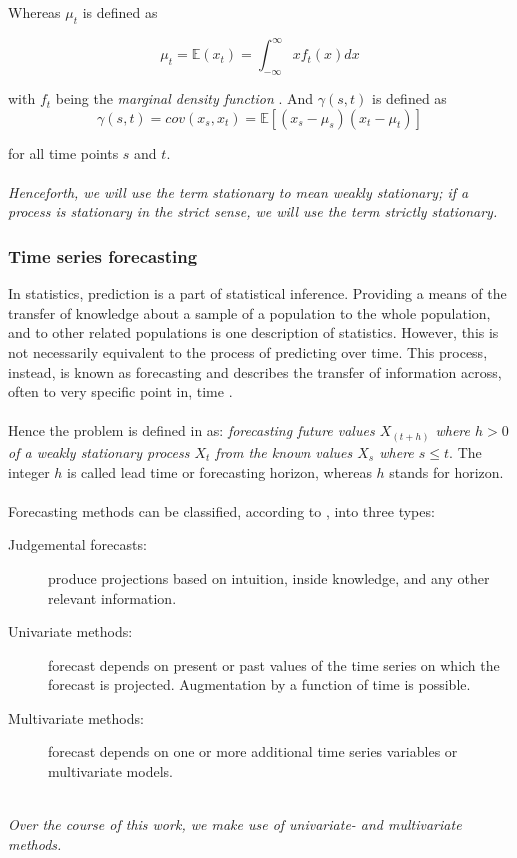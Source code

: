 Whereas $\mu_t$ is defined as

\begin{equation}
    \mu_{t}=\mathbb{E}(x_t)=\int_{-\infty}^{\infty} x f_t(x) dx
\end{equation}

with $f_t$ being the \textit{marginal density function} \cite{shumway2000time}.
And $\gamma(s, t)$ is defined as
\begin{equation}
    \gamma(s, t)=cov(x_s, x_t)=\mathbb{E}[(x_s-\mu_s)(x_t-\mu_t)]
\end{equation}

for all time points $s$ and $t$.
\\
\\
\textit{Henceforth, we will use the term stationary to mean weakly stationary; if a process is stationary in the strict sense, we will use the term strictly stationary.}

\subsubsection{Time series forecasting}

In statistics, prediction is a part of statistical inference. 
Providing a means of the transfer of knowledge about a sample of a population to the whole population, and to other related populations is one description of statistics. 
However, this is not necessarily equivalent to the process of predicting over time. 
This process, instead, is known as forecasting and describes the transfer of information across, often to very specific point in, time \cite{wiki-timeseries}. \\
\\
Hence the problem is defined in \cite{ito1993encyclopedic} as: \textit{forecasting future values $X_(t+h)$ where $h > 0$ of a weakly stationary process ${X_t}$ from the known values $X_s$ where $s \leq t$}. 
The integer $h$ is called lead time or forecasting horizon, whereas $h$ stands for horizon.
\\
\\
Forecasting methods can be classified, according to \cite{chatfield2000time}, into three types:
\begin{description}
    \item[Judgemental forecasts:] produce projections based on intuition, inside knowledge, and any other relevant information.
    \item[Univariate methods:] forecast depends on present or past values of the time series on which the forecast is projected. Augmentation by a function of time is possible.
    \item[Multivariate methods:] forecast depends on one or more additional time series variables or multivariate models.
\end{description}
\hfill
\\
\textit{Over the course of this work, we make use of univariate- and multivariate methods.}


